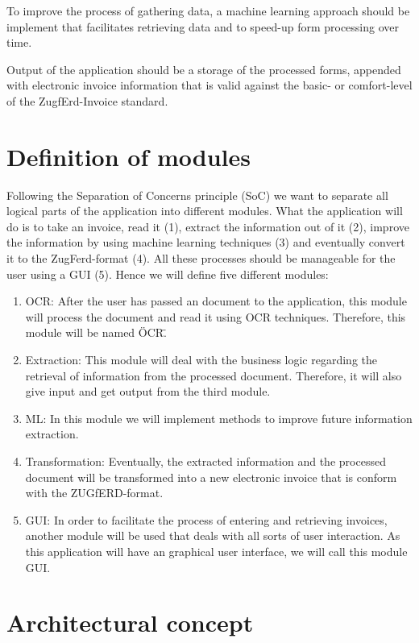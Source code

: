 To improve the process of gathering data, a machine learning approach should be implement that facilitates retrieving data and to speed-up form processing over time.

Output of the application should be a storage of the processed forms, appended with electronic invoice information that is valid against the basic- or comfort-level of the ZugfErd-Invoice standard.

\section{Definition of modules}
\label{sec5.2}

Following the Separation of Concerns principle (SoC) we want to separate all logical parts of the application into different modules.
What the application will do is to take an invoice, read it (1), extract the information out of it (2), improve the information by using machine learning techniques (3) and eventually convert it to the ZugFerd-format (4). All these processes should be manageable for the user using a GUI (5).
Hence we will define five different modules:
\begin{enumerate}
	\item OCR: After the user has passed an document to the application, this module will process the document and read it using OCR techniques. Therefore, this module will be named \"OCR\".
	\item Extraction: This module will deal with the business logic regarding the retrieval of information from the processed document. Therefore, it will also give input and get output from the third module.
	\item ML: In this module we will implement methods to improve future information extraction.
	\item Transformation: Eventually, the extracted information and the processed document will be transformed into a new electronic invoice that is conform with the ZUGfERD-format.
	\item GUI: In order to facilitate the process of entering and retrieving invoices, another module will be used that deals with all sorts of user interaction. As this application will have an graphical user interface, we will call this module GUI.
\end{enumerate}

\section{Architectural concept}


